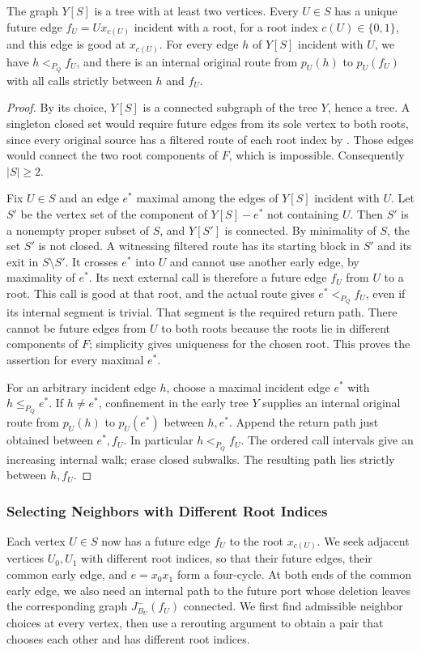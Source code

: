 \documentclass[USenglish, a4paper, thm-restate,numberwithinsect, cleveref]{lipics-v2021}
\begin{document}
\begin{lemma}
\label{lem:characterization-actual-closed-set}
The graph $Y[S]$ is a tree with at least two vertices. Every $U\in S$
has a unique future edge $f_U=Ux_{c(U)}$ incident with a root, for a
root index $c(U)\in\{0,1\}$, and this edge is good at $x_{c(U)}$.
For every edge $h$ of $Y[S]$ incident with $U$, we have
$h<_{P_Q}f_U$, and there is an internal
original route from $p_U(h)$ to $p_U(f_U)$ with all calls strictly
between $h$ and $f_U$.
\end{lemma}
\begin{proof}
By its choice, $Y[S]$ is a connected subgraph of the tree $Y$, hence a tree.
A singleton closed set would require future edges from its sole
vertex to both roots, since every original source has a filtered
route of each root index by . Those edges
would connect the two root components of $F$, which is impossible.
Consequently $|S|\ge2$.

Fix $U\in S$ and an edge $e^*$ maximal among the edges of $Y[S]$
incident with $U$. Let $S'$ be the vertex set of the component of
$Y[S]-e^*$ not containing $U$. Then $S'$ is a nonempty proper subset
of $S$, and $Y[S']$ is connected. By minimality of $S$, the set $S'$
is not closed. A witnessing filtered
route has its starting block in $S'$ and its exit in $S\setminus S'$.
It crosses $e^*$ into $U$ and cannot use another early edge, by
maximality of $e^*$. Its next external call is therefore a future edge
$f_U$ from $U$ to a root. This call is good at that root, and the
actual route gives $e^*<_{P_Q}f_U$, even if its internal segment is
trivial. That segment is the required return path.
There cannot be future edges from $U$ to both roots because the roots
lie in different components of $F$; simplicity gives uniqueness for
the chosen root. This proves the assertion for every maximal $e^*$.

For an arbitrary incident edge $h$, choose a maximal incident edge
$e^*$ with $h\le_{P_Q}e^*$. If $h\ne e^*$, confinement in the early tree
$Y$ supplies an internal original route from $p_U(h)$ to $p_U(e^*)$
between $h,e^*$. Append the return path just obtained between $e^*,f_U$.
In particular $h<_{P_Q}f_U$. The ordered call intervals give an
increasing internal walk; erase
closed subwalks. The resulting path lies strictly between $h,f_U$.
\end{proof}

\subsubsection{Selecting Neighbors with Different Root Indices}
Each vertex $U\in S$ now has a future edge $f_U$ to the root
$x_{c(U)}$. We seek adjacent vertices $U_0,U_1$ with different root
indices, so that their future edges, their common early edge, and
$e=x_0x_1$ form a four-cycle. At both ends of the common early edge,
we also need an internal path to the future port whose deletion
leaves the corresponding graph $J_{B_U}^-(f_U)$ connected. We first find
admissible neighbor choices at every vertex, then use a rerouting
argument to obtain a pair that chooses each other and has different
root indices.
\end{document}

